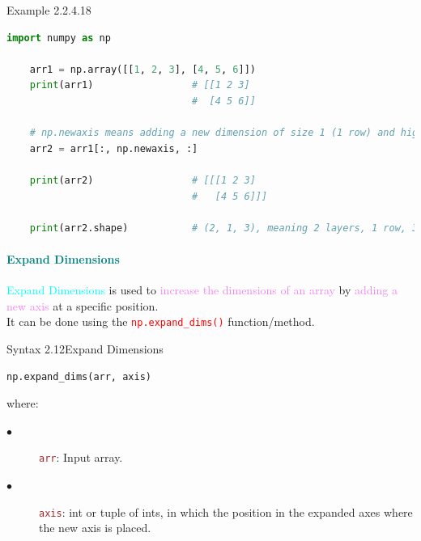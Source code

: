 \documentclass{book}
\begin{document}
\begin{egBox}{Example 2.2.4.18}{}
    \begin{lstlisting}[language=Python, basicstyle=\ttfamily\small, keywordstyle=\color{blue}, commentstyle=\color{forestgreen}, stringstyle=\color{red}, showstringspaces=false]
    import numpy as np

    arr1 = np.array([[1, 2, 3], [4, 5, 6]])
    print(arr1)                 # [[1 2 3]
                                #  [4 5 6]]

    # np.newaxis means adding a new dimension of size 1 (1 row) and highest dimension (column)
    arr2 = arr1[:, np.newaxis, :]

    print(arr2)                 # [[[1 2 3]
                                #   [4 5 6]]]

    print(arr2.shape)           # (2, 1, 3), meaning 2 layers, 1 row, 3 columns
    \end{lstlisting}
\end{egBox}
\newpage
\textcolor{teal}{\paragraph{Expand Dimensions}}
\textcolor{cyan}{Expand Dimensions} is used to \textcolor{violet}{increase the dimensions of an array} by \textcolor{violet}{adding a new axis} at a specific position.\\
It can be done using the \textcolor{red}{\texttt{np.expand\_dims()}} function/method.
\begin{synBox}{Syntax 2.12}{Expand Dimensions}
    \begin{lstlisting}[language=Python, basicstyle=\ttfamily\small, keywordstyle=\color{blue}, commentstyle=\color{forestgreen}, stringstyle=\color{red}, showstringspaces=false]
                                        np.expand_dims(arr, axis)
    \end{lstlisting}
    \raggedright
    where:\\
    \begin{description}
        \item[$\bullet$] \textcolor{brown}{\texttt{arr}}: Input array.
        \item[$\bullet$] \textcolor{brown}{\texttt{axis}}: int or tuple of ints, in which the position in the expanded axes where the new axis is placed.
    \end{description}
\end{synBox}
\end{document}
